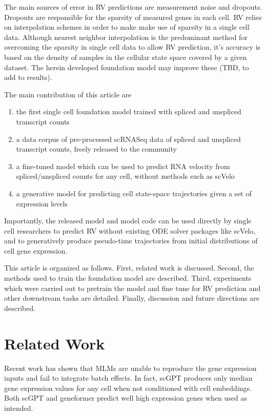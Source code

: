 \documentclass{article} %
\begin{document}
The main sources of error in RV predictions are measurement noise and dropouts. Dropouts are responsible for the sparsity of measured genes in each cell. RV relies on interpolation schemes in order to make make use of sparsity in a single cell data. Although nearest neighbor interpolation is the predominant method for overcoming the sparsity in single cell data to allow RV prediction, it's accuracy is based on the density of samples in the cellular state space covered by a given dataset. The herein developed foundation model may improve these (TBD, to add to results).

The main contribution of this article are 
\begin{enumerate}
\setlength{\itemsep}{0pt}
\item the first single cell foundation model trained with spliced and unspliced transcript counts 
\item a data corpus of pre-processed scRNASeq data of spliced and unspliced transcript counts, freely released to the community
\item a fine-tuned model which can be used to predict RNA velocity from spliced/unspliced counts for any cell, without methods such as scVelo
\item a generative model for predicting cell state-space trajectories given a set of expression levels
\end{enumerate}

Importantly, the released model and model code can be used directly by single cell researchers to predict RV without existing ODE solver packages like scVelo, and to generatively produce pseudo-time trajectories from initial distributions of cell gene expression.

This article is organized as follows. First, related work is discussed. Second, the methods used to train the foundation model are described. Third, experiments which were carried out to pretrain the model and fine tune for RV prediction and other downstream tasks are detailed. Finally, discussion and future directions are described.

  \section{Related Work}
 Recent work has shown that MLMs are unable to reproduce the gene expression inputs and fail to integrate batch effects. In fact, scGPT produces only median gene expression values for any cell when not conditioned with cell embeddings. Both scGPT and geneformer predict well high expression genes when used as intended.\cite{kedzierska2023assessing}
\end{document}
